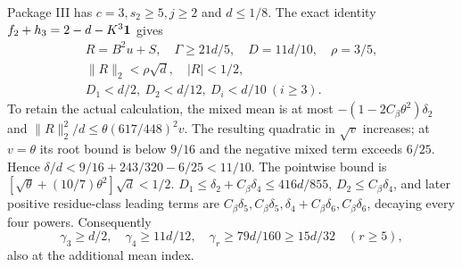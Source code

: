 Package III has $c=3,s_2\ge5,j\ge2$ and $d\le1/8$.
The exact identity $f_2+h_3=2-d-K^3\mathbf1$ gives
\begin{equation}\tag{R24.3.6}\label{eq:R24:III}
\begin{gathered}
R=B^2u+S,\quad\Gamma\ge21d/5,\quad D=11d/10,\quad\rho=3/5,\\
\|R\|_2<\rho\sqrt d,\quad|R|<1/2,\\
D_1<d/2,\ D_2<d/12,\ D_i<d/10\ (i\ge3).
\end{gathered}
\end{equation}
To retain the actual calculation, the mixed mean is at most
$-(1-2C_\beta\theta^2)\delta_2$ and
$\|R\|_2^2/d\le\theta(617/448)^2v$.
The resulting quadratic in $\sqrt v$ increases; at $v=\theta$ its
root bound is below $9/16$ and the negative mixed term exceeds
$6/25$. Hence $\delta/d<9/16+243/320-6/25<11/10$.
The pointwise bound is
$[\sqrt\theta+(10/7)\theta^2]\sqrt d<1/2$.
$D_1\le\delta_2+C_\beta\delta_4\le416d/855$,
$D_2\le C_\beta\delta_4$, and later positive residue-class leading
terms are $C_\beta\delta_5,\allowbreak C_\beta\delta_5,\allowbreak 
\delta_4+C_\beta\delta_6,\allowbreak C_\beta\delta_6$, decaying every four powers.
Consequently
\[
\gamma_3\ge d/2,\quad\gamma_4\ge11d/12,\quad
\gamma_r\ge79d/160\ge15d/32\quad(r\ge5),
\]
also at the additional mean index.

